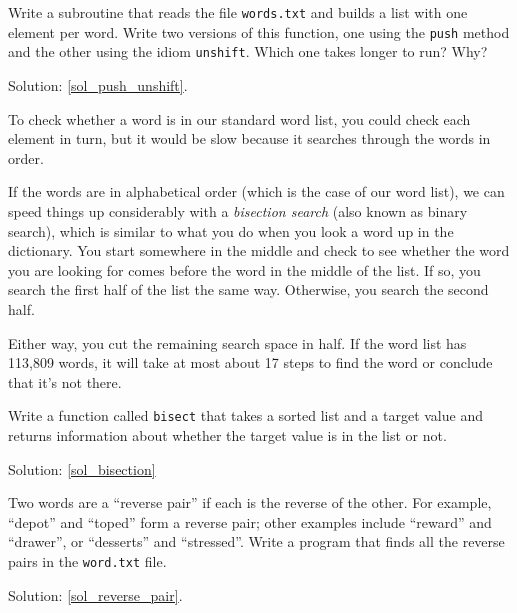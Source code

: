 \begin{exercise}

\label{push_unshift}
Write a subroutine that reads the file {\tt words.txt} and builds
a list with one element per word.  Write two versions of
this function, one using the {\tt push} method and the
other using the idiom {\tt unshift}.  Which one takes
longer to run?  Why?

Solution: \ref{sol_push_unshift}.


\end{exercise}


\begin{exercise}
\label{bisection}

To check whether a word is in our standard word list, 
you could check each element in turn, but it would be 
slow because it searches through the words in order.

If the words are in alphabetical order (which is the 
case of our word list), we can speed 
things up considerably with a \emph{bisection search} (also 
known as binary search), which is similar to what you 
do when you look a word up in the dictionary.  You
start somewhere in the middle and check to see whether 
the word you are looking for comes before the word in 
the middle of the list.  If so, you search the first 
half of the list the same way.  Otherwise, you search
the second half.

Either way, you cut the remaining search space in half. 
If the word list has 113,809 words, it will take at 
most about 17 steps to find the word or conclude that 
it's not there.

Write a function called \verb"bisect" that takes a 
sorted list and a target value and returns information 
about whether the target value is in the list or not.

Solution: \ref{sol_bisection}

\end{exercise}

\begin{exercise}
\label{reverse_pair}

Two words are a ``reverse pair'' if each is the reverse 
of the other.  For example, ``depot'' and ``toped'' form 
a reverse pair; other examples include ``reward'' and 
``drawer'', or ``desserts'' and ``stressed''. Write a 
program that finds all the reverse pairs in the {\tt word.txt}
file.

Solution: \ref{sol_reverse_pair}.

\end{exercise}

